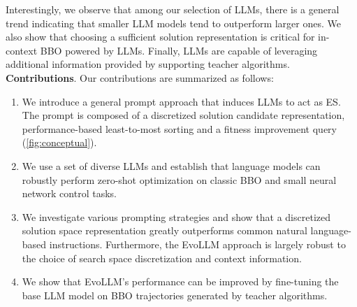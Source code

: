 \documentclass[sigconf]{acmart}
\begin{document}
Interestingly, we observe that among our selection of LLMs, there is a general trend indicating that smaller LLM models tend to outperform larger ones.
We also show that choosing a sufficient solution representation is critical for in-context BBO powered by LLMs.
Finally, LLMs are capable of leveraging additional information provided by supporting teacher algorithms.\\
\textbf{Contributions}. Our contributions are summarized as follows:
\begin{enumerate}
\item We introduce a general prompt approach that induces LLMs to act as ES. The prompt is composed of a discretized solution candidate representation, performance-based least-to-most sorting and a fitness improvement query (\cref{fig:conceptual}).
\item We use a set of diverse LLMs and establish that language models can robustly perform zero-shot optimization on classic BBO and small neural network control tasks.
\item We investigate various prompting strategies and show that a discretized solution space representation greatly outperforms common natural language-based instructions. Furthermore, the EvoLLM approach is largely robust to the choice of search space discretization and context information.
\item We show that EvoLLM's performance can be improved by fine-tuning the base LLM model on BBO trajectories generated by teacher algorithms.
\end{enumerate}
\end{document}
